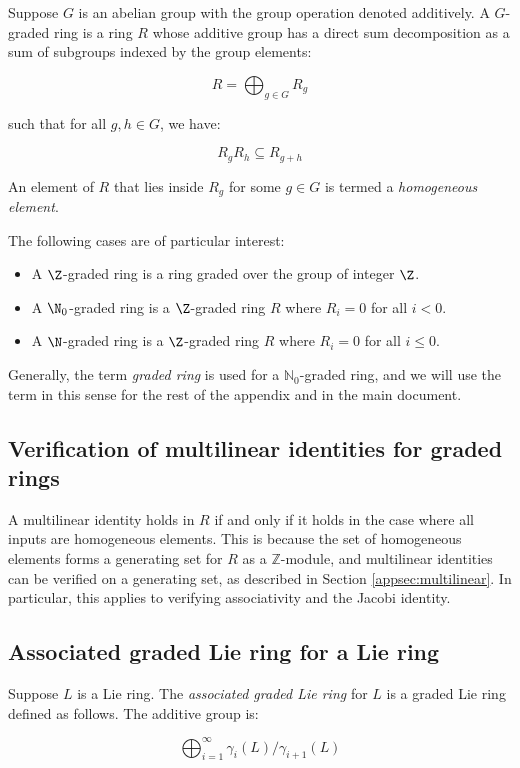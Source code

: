 \documentclass{ucetd}
\begin{document}
Suppose $G$ is an abelian group with the group operation denoted
additively. A $G$-graded ring is a ring $R$ whose additive group has a
direct sum decomposition as a sum of subgroups indexed by the group
elements:

$$R = \bigoplus_{g \in G} R_g$$

such that for all $g,h \in G$, we have:

$$R_gR_h \subseteq R_{g+h}$$

An element of $R$ that lies inside $R_g$ for some $g \in G$ is termed
a {\em homogeneous element}.

The following cases are of particular interest:

\begin{itemize}
\item A $\Z$-graded ring is a ring graded over the group of integer
  $\Z$.
\item A $\N_0$-graded ring is a $\Z$-graded ring $R$ where $R_i = 0$
  for all $i < 0$.
\item A $\N$-graded ring is a $\Z$-graded ring $R$ where $R_i = 0$ for
  all $i \le 0$.
\end{itemize}

Generally, the term {\em graded ring} is used for a
$\mathbb{N}_0$-graded ring, and we will use the term in this sense for
the rest of the appendix and in the main document.

\subsection{Verification of multilinear identities for graded rings}\label{appsec:multilinear-graded}

A multilinear identity holds in $R$ if and only if it holds in the
case where all inputs are homogeneous elements. This is because the
set of homogeneous elements forms a generating set for $R$ as a
$\mathbb{Z}$-module, and multilinear identities can be verified on a
generating set, as described in Section \ref{appsec:multilinear}. In
particular, this applies to verifying associativity and the Jacobi
identity.
\subsection{Associated graded Lie ring for a Lie ring}

Suppose $L$ is a Lie ring. The {\em
  associated graded Lie ring} for $L$ is a graded Lie ring defined as
follows. The additive group is:

$$\bigoplus_{i=1}^\infty \gamma_i(L)/\gamma_{i+1}(L)$$
\end{document}

